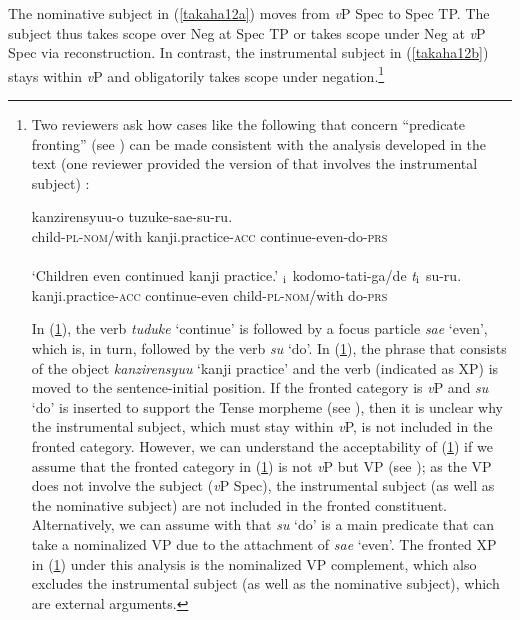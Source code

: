 \documentclass[output=paper]{langscibook}
\begin{document}
The nominative subject in (\ref{takaha12a}) moves from \emph{v}P Spec to Spec TP. The subject thus takes scope over Neg at Spec TP or takes scope under Neg at \emph{v}P Spec via reconstruction. In contrast, the instrumental subject in (\ref{takaha12b}) stays within \emph{v}P and obligatorily takes scope under negation.\footnote{Two reviewers ask how cases like the following that concern “predicate fronting” (see \citealt{HojiTada1989}) can be made consistent with the analysis developed in the text (one reviewer provided the version of  that involves the instrumental subject) : \footnotesize 
\begin{exe}
\ex
\begin{xlist}
\ex \label{takahaia}
 	{kanzirensyuu-o}		{tuzuke-sae-su-ru}.\\
child-\textsc{pl}-\textsc{nom}/with kanji.practice-\textsc{acc} continue-even-do-\textsc{prs}\\\\
`Children even continued kanji practice.’
\ex \label{takahaib}
$_{\textnormal{i}}$ {kodomo-tati-ga/de} \emph{t}$_{\textnormal{i}}$ {su-ru}.\\
{} kanji.practice-\textsc{acc} continue-even child-\textsc{pl}-\textsc{nom}/with {} do-\textsc{prs}\\
\end{xlist}
\end{exe}
In (\ref{takahaia}), the verb \emph{tuduke} ‘continue’ is followed by a focus particle \emph{sae} ‘even’, which is, in turn, followed by the verb \emph{su} ‘do’. In (\ref{takahaib}), the phrase that consists of the object \emph{kanzirensyuu} ‘kanji practice’ and the verb (indicated as XP) is moved to the sentence-initial position. If the fronted category is \emph{v}P and \emph{su} ‘do’ is inserted to support the Tense morpheme (see \citealt{Yatsushiro1999}), then it is unclear why the instrumental subject, which must stay within \emph{v}P, is not included in the fronted category. However, we can understand the acceptability of (\ref{takahaib}) if we assume that the fronted category in (\ref{takahaib}) is not \emph{v}P but VP (see \citealt{Kitaoka2014, Funakoshi2020}); as the VP does not involve the subject (\emph{v}P Spec), the instrumental subject (as well as the nominative subject) are not included in the fronted constituent. Alternatively, we can assume with \citet{Saito2006b} that \emph{su} ‘do’ is a main predicate that can take a nominalized VP due to the attachment of \emph{sae} ‘even’. The fronted XP in (\ref{takahaib}) under this analysis is the nominalized VP complement, which also excludes the instrumental subject (as well as the nominative subject), which are external arguments.}
\end{document}
